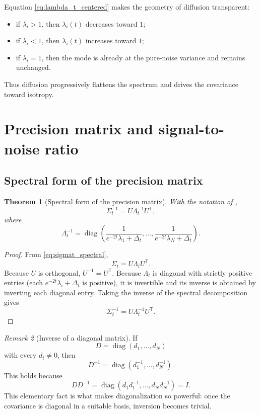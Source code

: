 \documentclass[11pt]{article}
\numberwithin{equation}{section}
\newtheorem{theorem}{Theorem}[section]
\theoremstyle{definition}
\theoremstyle{remark}
\newtheorem{remark}[theorem]{Remark}
\newcommand{\diag}{\operatorname{diag}}
\newcommand{\Id}{I}
\newcommand{\trans}{\mathsf{T}}
\begin{document}
Equation \eqref{eq:lambda_t_centered} makes the geometry of diffusion transparent:
\begin{itemize}[leftmargin=1cm]
\item if $\lambda_i>1$, then $\lambda_i(t)$ decreases toward $1$;
\item if $\lambda_i<1$, then $\lambda_i(t)$ increases toward $1$;
\item if $\lambda_i=1$, then the mode is already at the pure-noise variance and remains unchanged.
\end{itemize}
Thus diffusion progressively flattens the spectrum and drives the covariance toward isotropy.

\section{Precision matrix and signal-to-noise ratio}\label{sec:precision_snr}

\subsection{Spectral form of the precision matrix}

\begin{theorem}[Spectral form of the precision matrix]\label{thm:precision_spectral}
With the notation of ,
\begin{equation}\label{eq:precision_spectral}
\Sigma_t^{-1}=U\Lambda_t^{-1}U^\trans,
\end{equation}
where
\begin{equation}\label{eq:lambda_t_inv}
\Lambda_t^{-1}
=
\diag\!\left(
\frac{1}{e^{-2t}\lambda_1+\Delta_t},
\dots,
\frac{1}{e^{-2t}\lambda_N+\Delta_t}
\right).
\end{equation}
\end{theorem}

\begin{proof}
From \eqref{eq:sigmat_spectral},
\[
\Sigma_t=U\Lambda_tU^\trans.
\]
Because $U$ is orthogonal, $U^{-1}=U^\trans$. Because $\Lambda_t$ is diagonal with strictly positive entries (each $e^{-2t}\lambda_i+\Delta_t$ is positive), it is invertible and its inverse is obtained by inverting each diagonal entry. Taking the inverse of the spectral decomposition gives
\[
\Sigma_t^{-1}=U\Lambda_t^{-1}U^\trans.
\]
\end{proof}

\begin{remark}[Inverse of a diagonal matrix]
If
\[
D=\diag(d_1,\dots,d_N)
\]
with every $d_i\neq 0$, then
\[
D^{-1}=\diag(d_1^{-1},\dots,d_N^{-1}).
\]
This holds because
\[
DD^{-1}
=
\diag(d_1d_1^{-1},\dots,d_Nd_N^{-1})
=
\Id.
\]
This elementary fact is what makes diagonalization so powerful: once the covariance is diagonal in a suitable basis, inversion becomes trivial.
\end{remark}
\end{document}
